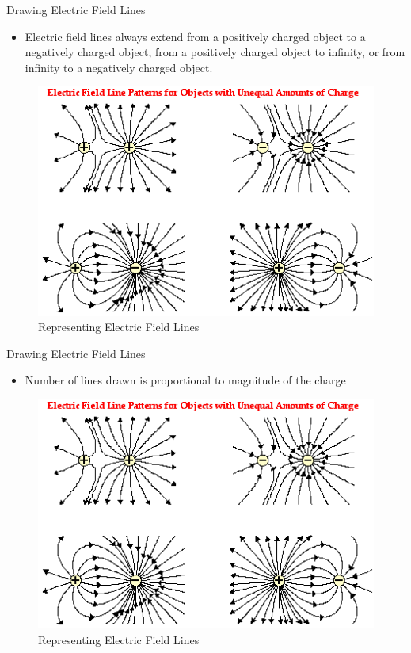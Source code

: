 \documentclass{beamer}
\begin{document}
\begin{frame}{Drawing Electric Field Lines}{}
  \begin{itemize}
	\item  Electric field lines always extend from a positively charged object to a negatively charged object, from a positively charged object to infinity, or from infinity to a negatively charged object.
  \end{itemize}
\begin{figure}
\includegraphics[scale=0.45]{fieldlines}
\caption{Representing Electric Field Lines}
\end{figure}
\end{frame}

\begin{frame}{Drawing Electric Field Lines}{}
  \begin{itemize}
	\item Number of lines drawn is proportional to magnitude of the charge
  \end{itemize}
\begin{figure}
\includegraphics[scale=0.45]{fieldlines}
\caption{Representing Electric Field Lines}
\end{figure}
\end{frame}
\end{document}

